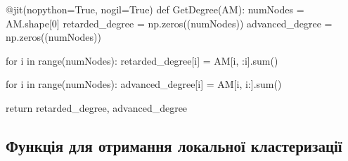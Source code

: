 \documentclass[
  letterpaper,
]{report}
\newenvironment{Shaded}{\begin{snugshade}}{\end{snugshade}}
\newcommand{\AttributeTok}[1]{\textcolor[rgb]{0.40,0.45,0.13}{#1}}
\newcommand{\BuiltInTok}[1]{\textcolor[rgb]{0.00,0.23,0.31}{#1}}
\newcommand{\ControlFlowTok}[1]{\textcolor[rgb]{0.00,0.23,0.31}{#1}}
\newcommand{\DecValTok}[1]{\textcolor[rgb]{0.68,0.00,0.00}{#1}}
\newcommand{\KeywordTok}[1]{\textcolor[rgb]{0.00,0.23,0.31}{#1}}
\newcommand{\NormalTok}[1]{\textcolor[rgb]{0.00,0.23,0.31}{#1}}
\newcommand{\OperatorTok}[1]{\textcolor[rgb]{0.37,0.37,0.37}{#1}}
\newcommand{\VariableTok}[1]{\textcolor[rgb]{0.07,0.07,0.07}{#1}}
\begin{document}
\begin{Shaded}
\begin{Highlighting}[]
\AttributeTok{@jit}\NormalTok{(nopython}\OperatorTok{=}\VariableTok{True}\NormalTok{, nogil}\OperatorTok{=}\VariableTok{True}\NormalTok{) }
\KeywordTok{def}\NormalTok{ GetDegree(AM):}
\NormalTok{    numNodes }\OperatorTok{=}\NormalTok{ AM.shape[}\DecValTok{0}\NormalTok{]}
\NormalTok{    retarded\_degree }\OperatorTok{=}\NormalTok{ np.zeros((numNodes))}
\NormalTok{    advanced\_degree }\OperatorTok{=}\NormalTok{ np.zeros((numNodes))}
     
    \ControlFlowTok{for}\NormalTok{ i }\KeywordTok{in} \BuiltInTok{range}\NormalTok{(numNodes):}
\NormalTok{        retarded\_degree[i] }\OperatorTok{=}\NormalTok{ AM[i, :i].}\BuiltInTok{sum}\NormalTok{()}

    \ControlFlowTok{for}\NormalTok{ i }\KeywordTok{in} \BuiltInTok{range}\NormalTok{(numNodes):}
\NormalTok{        advanced\_degree[i] }\OperatorTok{=}\NormalTok{ AM[i, i:].}\BuiltInTok{sum}\NormalTok{()}
        
    \ControlFlowTok{return}\NormalTok{ retarded\_degree, advanced\_degree}
    
\end{Highlighting}
\end{Shaded}

\hypertarget{ux444ux443ux43dux43aux446ux456ux44f-ux434ux43bux44f-ux43eux442ux440ux438ux43cux430ux43dux43dux44f-ux43bux43eux43aux430ux43bux44cux43dux43eux457-ux43aux43bux430ux441ux442ux435ux440ux438ux437ux430ux446ux456ux457}{%
\subsection{Функція для отримання локальної
кластеризації}\label{ux444ux443ux43dux43aux446ux456ux44f-ux434ux43bux44f-ux43eux442ux440ux438ux43cux430ux43dux43dux44f-ux43bux43eux43aux430ux43bux44cux43dux43eux457-ux43aux43bux430ux441ux442ux435ux440ux438ux437ux430ux446ux456ux457}}
\end{document}
